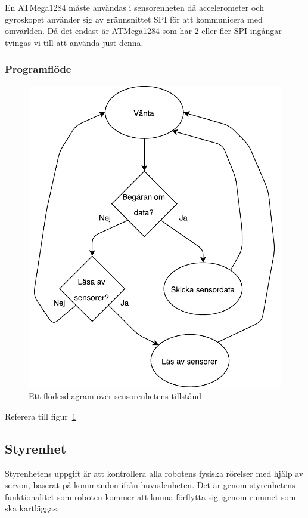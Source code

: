 \documentclass{article}
\begin{document}
En ATMega1284 måste användas i sensorenheten då accelerometer och gyroskopet använder sig av grännsnittet SPI för att kommunicera med omvärlden. Då det endast är ATMega1284 som har 2 eller fler SPI ingångar tvingas vi till att använda just denna.

\subsubsection{Programflöde}

\begin{figure}[H]
\centering
\includegraphics[scale=0.6]{sensorenhet_flowchart}
\caption{Ett flödesdiagram över sensorenhetens tillstånd}
\label{fig:sensorenhet_flowchart}
\end{figure}
Referera till figur~\ref{fig:sensorenhet_flowchart} 

\clearpage

\subsection{Styrenhet}
Styrenhetens uppgift är att kontrollera alla robotens fysiska rörelser med hjälp av servon, baserat på kommandon ifrån huvudenheten. Det är genom styrenhetens funktionalitet  som roboten kommer att kunna förflytta sig igenom rummet som ska kartläggas.
 
\end{document}
